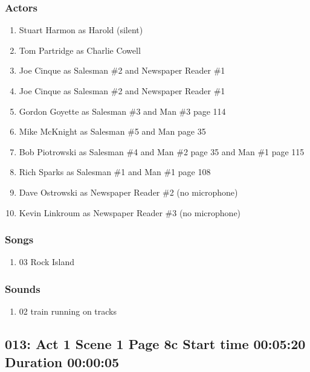 \subsubsection{Actors}
\begin{enumerate}
\item Stuart Harmon as Harold (silent)
\item Tom Partridge as Charlie Cowell
\item Joe Cinque as Salesman \#2 and Newspaper Reader \#1
\item Joe Cinque as Salesman \#2 and Newspaper Reader \#1
\item Gordon Goyette as Salesman \#3 and Man \#3 page 114
\item Mike McKnight as Salesman \#5 and Man page 35
\item Bob Piotrowski as Salesman \#4 and Man \#2 page 35 and Man \#1 page 115
\item Rich Sparks as Salesman \#1 and Man \#1 page 108
\item Dave Ostrowski as Newspaper Reader \#2 (no microphone)
\item Kevin Linkroum as Newspaper Reader \#3 (no microphone)
\end{enumerate}

\subsubsection{Songs}
\begin{enumerate}
\item 03 Rock Island
\end{enumerate}\subsubsection{Sounds}
\begin{enumerate}
\item 02 train running on tracks
\end{enumerate}
\subsection{013: Act 1 Scene 1 Page 8c Start time 00:05:20 Duration 00:00:05}

